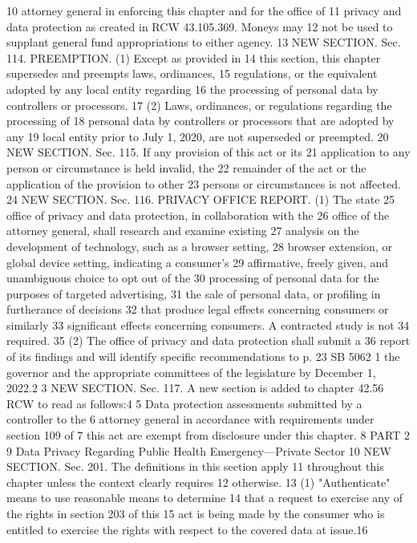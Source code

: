 10 attorney general in enforcing this chapter and for the office of
11 privacy and data protection as created in RCW 43.105.369. Moneys may
12 not be used to supplant general fund appropriations to either agency.
13 NEW SECTION. Sec. 114. PREEMPTION. (1) Except as provided in
14 this section, this chapter supersedes and preempts laws, ordinances,
15 regulations, or the equivalent adopted by any local entity regarding
16 the processing of personal data by controllers or processors.
17 (2) Laws, ordinances, or regulations regarding the processing of
18 personal data by controllers or processors that are adopted by any
19 local entity prior to July 1, 2020, are not superseded or preempted.
20 NEW SECTION. Sec. 115. If any provision of this act or its
21 application to any person or circumstance is held invalid, the
22 remainder of the act or the application of the provision to other
23 persons or circumstances is not affected.
24 NEW SECTION. Sec. 116. PRIVACY OFFICE REPORT. (1) The state
25 office of privacy and data protection, in collaboration with the
26 office of the attorney general, shall research and examine existing
27 analysis on the development of technology, such as a browser setting,
28 browser extension, or global device setting, indicating a consumer's
29 affirmative, freely given, and unambiguous choice to opt out of the
30 processing of personal data for the purposes of targeted advertising,
31 the sale of personal data, or profiling in furtherance of decisions
32 that produce legal effects concerning consumers or similarly
33 significant effects concerning consumers. A contracted study is not
34 required.
35 (2) The office of privacy and data protection shall submit a
36 report of its findings and will identify specific recommendations to
p. 23 SB 5062
1 the governor and the appropriate committees of the legislature by
December 1, 2022.2
3 NEW SECTION. Sec. 117. A new section is added to chapter 42.56
RCW to read as follows:4
5 Data protection assessments submitted by a controller to the
6 attorney general in accordance with requirements under section 109 of
7 this act are exempt from disclosure under this chapter.
8 PART 2
9 Data Privacy Regarding Public Health Emergency—Private Sector
10 NEW SECTION. Sec. 201. The definitions in this section apply
11 throughout this chapter unless the context clearly requires
12 otherwise.
13 (1) "Authenticate" means to use reasonable means to determine
14 that a request to exercise any of the rights in section 203 of this
15 act is being made by the consumer who is entitled to exercise the
rights with respect to the covered data at issue.16
